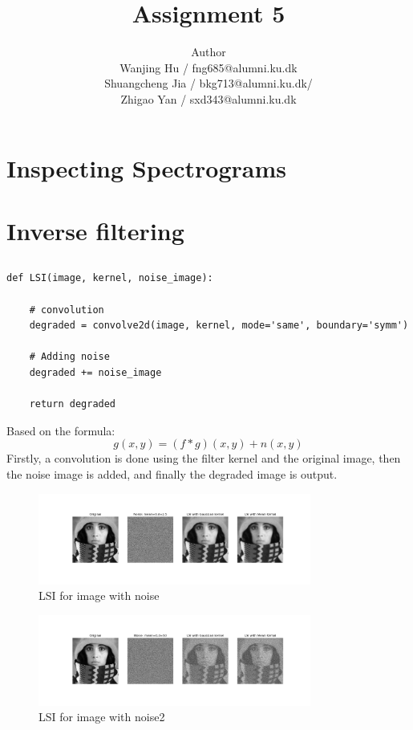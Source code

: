 \documentclass[12pt]{article}
\title{Assignment 5}
\author{Author \\
 Wanjing Hu / fng685@alumni.ku.dk  \\
 Shuangcheng Jia / bkg713@alumni.ku.dk/   \\
 Zhigao Yan / sxd343@alumni.ku.dk  \\
}
\begin{document}
\maketitle

\section{Inspecting Spectrograms}
\section{Inverse filtering}
\subsection{}
\begin{lstlisting}
def LSI(image, kernel, noise_image):

    # convolution
    degraded = convolve2d(image, kernel, mode='same', boundary='symm')
    
    # Adding noise
    degraded += noise_image

    return degraded
\end{lstlisting}
Based on the formula:
\[g(x,y) = (f*g)(x,y)+n(x,y)\]
Firstly, a convolution is done using the filter kernel and the original image, then the noise image is added, and finally the degraded image is output.
\begin{figure}[h]
    \centering
    \includegraphics[width=0.8\textwidth]{pics/a5_2.1_1.png} 
    \caption{LSI for image with noise}
\end{figure}
\begin{figure}[h]
    \centering
    \includegraphics[width=0.8\textwidth]{pics/a5_2.1_2.png} 
    \caption{LSI for image with noise2}
\end{figure}
\end{document}
